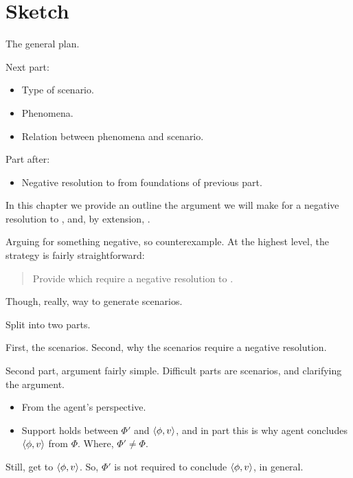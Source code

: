 \chapter{Sketch}
\label{cha:sketch}

\begin{note}
  \color{red}
  The general plan.

  Next part:
  \begin{itemize}
  \item
    Type of scenario.
  \item
    Phenomena.
  \item
    Relation between phenomena and scenario.
  \end{itemize}
  Part after:
  \begin{itemize}
  \item
    Negative resolution to \issueConstraint{} from foundations of previous part.
  \end{itemize}
\end{note}

\begin{note}
  In this chapter we provide an outline the argument we will make for a negative resolution to \issueConstraint{}, and, by extension, \issueInclusion{}.

  Arguing for something negative, so counterexample.
  At the highest level, the strategy is fairly straightforward:
  \begin{quote}
    Provide  which require a negative resolution to \issueConstraint{}.
  \end{quote}

  Though, really, way to generate scenarios.

  Split into two parts.

  First, the scenarios.
  Second, why the scenarios require a negative resolution.
\end{note}

\begin{note}
  Second part, argument fairly simple.
  Difficult parts are scenarios, and clarifying the argument.
\end{note}

\begin{note}[Goal]
  \begin{itemize}
  \item
    From the agent's perspective.
  \item
    Support holds between \(\Phi'\) and \(\langle \phi, v \rangle\), and in part this is why agent concludes \(\langle \phi, v \rangle\) from \(\Phi\).
    Where, \(\Phi' \ne \Phi\).
  \end{itemize}

  Still, get to \(\langle \phi, v \rangle\).
  So, \(\Phi'\) is not required to conclude \(\langle \phi, v \rangle\), in general.
\end{note}

